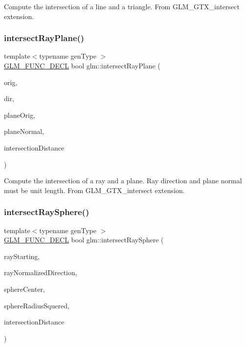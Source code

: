 Compute the intersection of a line and a triangle. From G\+L\+M\+\_\+\+G\+T\+X\+\_\+intersect extension. \mbox{\label{group__gtx__intersect_gad3697a9700ea379739a667ea02573488}} 
\subsubsection{\texorpdfstring{intersect\+Ray\+Plane()}{intersectRayPlane()}}
{\footnotesize\ttfamily template$<$typename gen\+Type $>$ \\
\hyperlink{setup_8hpp_ab2d052de21a70539923e9bcbf6e83a51}{G\+L\+M\+\_\+\+F\+U\+N\+C\+\_\+\+D\+E\+CL} bool glm\+::intersect\+Ray\+Plane (\begin{DoxyParamCaption}\item[{gen\+Type const \&}]{orig,  }\item[{gen\+Type const \&}]{dir,  }\item[{gen\+Type const \&}]{plane\+Orig,  }\item[{gen\+Type const \&}]{plane\+Normal,  }\item[{typename gen\+Type\+::value\+\_\+type \&}]{intersection\+Distance }\end{DoxyParamCaption})}

Compute the intersection of a ray and a plane. Ray direction and plane normal must be unit length. From G\+L\+M\+\_\+\+G\+T\+X\+\_\+intersect extension. \mbox{\label{group__gtx__intersect_gac88f8cd84c4bcb5b947d56acbbcfa56e}} 
\subsubsection{\texorpdfstring{intersect\+Ray\+Sphere()}{intersectRaySphere()}\hspace{0.1cm}{\footnotesize\ttfamily [1/2]}}
{\footnotesize\ttfamily template$<$typename gen\+Type $>$ \\
\hyperlink{setup_8hpp_ab2d052de21a70539923e9bcbf6e83a51}{G\+L\+M\+\_\+\+F\+U\+N\+C\+\_\+\+D\+E\+CL} bool glm\+::intersect\+Ray\+Sphere (\begin{DoxyParamCaption}\item[{gen\+Type const \&}]{ray\+Starting,  }\item[{gen\+Type const \&}]{ray\+Normalized\+Direction,  }\item[{gen\+Type const \&}]{sphere\+Center,  }\item[{typename gen\+Type\+::value\+\_\+type const}]{sphere\+Radius\+Squered,  }\item[{typename gen\+Type\+::value\+\_\+type \&}]{intersection\+Distance }\end{DoxyParamCaption})}

